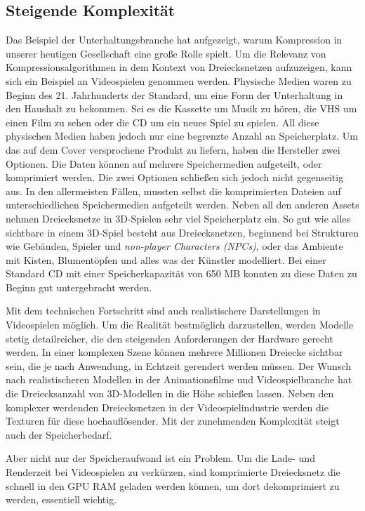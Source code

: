 \subsection{Steigende Komplexität}
\label{subsec:steigende_komplexität}
Das Beispiel der Unterhaltungsbranche hat aufgezeigt, warum Kompression in unserer heutigen Gesellschaft eine große Rolle spielt.
Um die Relevanz von Kompressionsalgorithmen in dem Kontext von Dreiecksnetzen aufzuzeigen, kann sich ein Beispiel an Videospielen genommen werden.
Physische Medien waren zu Beginn des 21. Jahrhunderts der Standard, um eine Form der Unterhaltung in den Haushalt zu bekommen.
Sei es die Kassette um Musik zu hören, die VHS um einen Film zu sehen oder die CD um ein neues Spiel zu spielen.
All diese physischen Medien haben jedoch nur eine begrenzte Anzahl an Speicherplatz.
Um das auf dem Cover versprochene Produkt zu liefern, haben die Hersteller zwei Optionen.
Die Daten können auf mehrere Speichermedien aufgeteilt, oder komprimiert werden.
Die zwei Optionen schließen sich jedoch nicht gegenseitig aus.
In den allermeisten Fällen, mussten selbst die komprimierten Dateien auf unterschiedlichen Speichermedien aufgeteilt werden.
Neben all den anderen Assets nehmen Dreiecksnetze in 3D-Spielen sehr viel Speicherplatz ein.
So gut wie alles sichtbare in einem 3D-Spiel besteht aus Dreiecksnetzen, beginnend bei Strukturen wie Gebäuden, Spieler und \textit{non-player Characters (NPCs)}, oder das Ambiente mit Kisten, Blumentöpfen und alles was der Künstler modelliert.
Bei einer Standard CD mit einer Speicherkapazität von 650 MB konnten zu diese Daten zu Beginn gut untergebracht werden. \newline

Mit dem technischen Fortschritt sind auch realistischere Darstellungen in Videospielen möglich.
Um die Realität bestmöglich darzustellen, werden Modelle stetig detailreicher, die den steigenden Anforderungen der Hardware gerecht werden. 
In einer komplexen Szene können mehrere Millionen Dreiecke sichtbar sein, die je nach Anwendung, in Echtzeit gerendert werden müssen.
Der Wunsch nach realistischeren Modellen in der Animationsfilme und Videospielbranche hat die Dreiecksanzahl von 3D-Modellen in die Höhe schießen lassen.
Neben den komplexer werdenden Dreiecksnetzen in der Videospielindustrie werden die Texturen für diese hochauflösender.
Mit der zunehmenden Komplexität steigt auch der Speicherbedarf. \newline

Aber nicht nur der Speicheraufwand ist ein Problem.
Um die Lade- und Renderzeit bei Videospielen zu verkürzen, sind komprimierte Dreiecksnetz die schnell in den GPU RAM geladen werden können, um dort dekomprimiert zu werden, essentiell wichtig.


